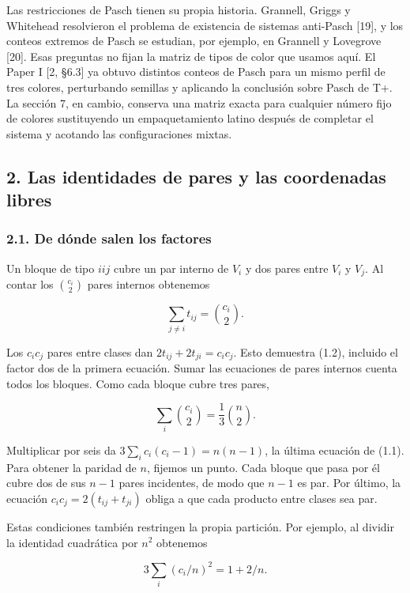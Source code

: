 \documentclass[spanish,11pt,a4paper]{article}
\begin{document}
Las restricciones de Pasch tienen su propia historia. Grannell, Griggs y Whitehead resolvieron el problema de existencia de sistemas anti-Pasch {[}19{]}, y los conteos extremos de Pasch se estudian, por ejemplo, en Grannell y Lovegrove {[}20{]}. Esas preguntas no fijan la matriz de tipos de color que usamos aquí. El Paper I {[}2, §6.3{]} ya obtuvo distintos conteos de Pasch para un mismo perfil de tres colores, perturbando semillas y aplicando la conclusión sobre Pasch de T+. La sección 7, en cambio, conserva una matriz exacta para cualquier número fijo de colores sustituyendo un empaquetamiento latino después de completar el sistema y acotando las configuraciones mixtas.

\subsection{2. Las identidades de pares y las coordenadas libres}\label{las-identidades-de-pares-y-las-coordenadas-libres}

\subsubsection{2.1. De dónde salen los factores}\label{de-duxf3nde-salen-los-factores}

Un bloque de tipo \(iij\) cubre un par interno de \(V_i\) y dos pares entre \(V_i\) y \(V_j\). Al contar los \(\binom{c_i}{2}\) pares internos obtenemos

\[\sum_{j\ne i}t_{ij}=\binom{c_i}{2}.\]

Los \(c_ic_j\) pares entre clases dan \(2t_{ij}+2t_{ji}=c_ic_j\). Esto demuestra (1.2), incluido el factor dos de la primera ecuación. Sumar las ecuaciones de pares internos cuenta todos los bloques. Como cada bloque cubre tres pares,

\[\sum_i\binom{c_i}{2}=\frac13\binom n2.\]

Multiplicar por seis da \(3\sum_i c_i(c_i-1)=n(n-1)\), la última ecuación de (1.1). Para obtener la paridad de \(n\), fijemos un punto. Cada bloque que pasa por él cubre dos de sus \(n-1\) pares incidentes, de modo que \(n-1\) es par. Por último, la ecuación \(c_ic_j=2(t_{ij}+t_{ji})\) obliga a que cada producto entre clases sea par.

Estas condiciones también restringen la propia partición. Por ejemplo, al dividir la identidad cuadrática por \(n^2\) obtenemos

\[3\sum_i(c_i/n)^2=1+2/n.\tag{2.1}\]
\end{document}
